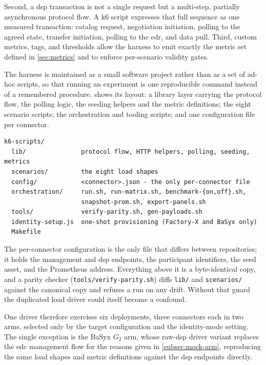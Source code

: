 Second, a \gls{dsp} transaction is not a single request but a multi-step, partially asynchronous protocol flow. A k6 script expresses that full sequence as one measured transaction: catalog request, negotiation initiation, polling to the agreed state, transfer initiation, polling to the \gls{edr}, and data pull. Third, custom metrics, tags, and thresholds allow the harness to emit exactly the metric set defined in \cref{sec:metrics} and to enforce per-scenario validity gates.

The harness is maintained as a small software project rather than as a set of ad-hoc scripts, so that running an experiment is one reproducible command instead of a remembered procedure.  shows its layout: a library layer carrying the protocol flow, the polling logic, the seeding helpers and the metric definitions; the eight scenario scripts; the orchestration and tooling scripts; and one configuration file per connector.

\pagebreak

\begin{lstlisting}[numbers=none, basicstyle=\scriptsize\ttfamily, columns=fixed, caption={Layout of the k6 harness. The lib/ and scenarios/ directories are byte-identical in all three connector repositories and are checked as such before every run.}, label=lst:harness-layout]
k6-scripts/
  lib/               protocol flow, HTTP helpers, polling, seeding, metrics
  scenarios/         the eight load shapes
  config/            <connector>.json - the only per-connector file
  orchestration/     run.sh, run-matrix.sh, benchmark-{on,off}.sh,
                     snapshot-prom.sh, export-panels.sh
  tools/             verify-parity.sh, gen-payloads.sh
  identity-setup.js  one-shot provisioning (Factory-X and BaSyx only)
  Makefile
\end{lstlisting}

The per-connector configuration is the only file that differs between repositories; it holds the management and \gls{dsp} endpoints, the participant identifiers, the seed asset, and the Prometheus address. Everything above it is a byte-identical copy, and a parity checker (\texttt{tools/verify-parity.sh}) diffs \texttt{lib/} and \texttt{scenarios/} against the canonical copy and refuses a run on any drift. Without that guard the duplicated load driver could itself become a confound.

One driver therefore exercises six deployments, three connectors each in two arms, selected only by the target configuration and the identity-mode setting. The single exception is the BaSyx $G_2$ arm, whose raw-\gls{dsp} driver variant replaces the \gls{edc} management flow for the reasons given in \cref{subsec:mock-arm}, reproducing the same load shapes and metric definitions against the \gls{dsp} endpoints directly.

